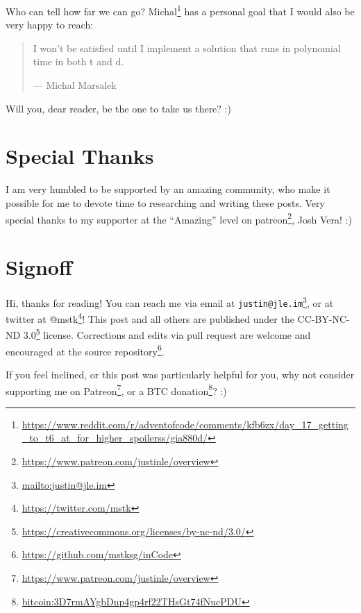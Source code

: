 \documentclass[]{article}
\renewcommand{\href}[2]{#2\footnote{\url{#1}}}
\begin{document}
Who can tell how far we can go?
\href{https://www.reddit.com/r/adventofcode/comments/kfb6zx/day_17_getting_to_t6_at_for_higher_spoilerss/gia880d/}{Michal}
has a personal goal that I would also be very happy to reach:

\begin{quote}
I won't be satisfied until I implement a solution that runs in polynomial time
in both t and d.

--- Michal Marsalek
\end{quote}

Will you, dear reader, be the one to take us there? :)

\hypertarget{special-thanks}{%
\section{Special Thanks}\label{special-thanks}}

I am very humbled to be supported by an amazing community, who make it possible
for me to devote time to researching and writing these posts. Very special
thanks to my supporter at the ``Amazing'' level on
\href{https://www.patreon.com/justinle/overview}{patreon}, Josh Vera! :)

\hypertarget{signoff}{%
\section{Signoff}\label{signoff}}

Hi, thanks for reading! You can reach me via email at
\href{mailto:justin@jle.im}{\nolinkurl{justin@jle.im}}, or at twitter at
\href{https://twitter.com/mstk}{@mstk}! This post and all others are published
under the \href{https://creativecommons.org/licenses/by-nc-nd/3.0/}{CC-BY-NC-ND
3.0} license. Corrections and edits via pull request are welcome and encouraged
at \href{https://github.com/mstksg/inCode}{the source repository}.

If you feel inclined, or this post was particularly helpful for you, why not
consider \href{https://www.patreon.com/justinle/overview}{supporting me on
Patreon}, or a \href{bitcoin:3D7rmAYgbDnp4gp4rf22THsGt74fNucPDU}{BTC donation}?
:)
\end{document}
